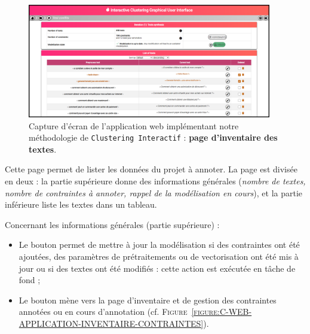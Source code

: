 		\begin{figure}[H]
			\centering
			\includegraphics[width=0.95\textwidth]{figures/interactive-clustering-application-textes}
			\caption{
				Capture d'écran de l'application web implémentant notre méthodologie de \texttt{Clustering Interactif} : \textbf{page d'inventaire des textes}.
			}
			\label{figure:C-WEB-APPLICATION-INVENTAIRE-TEXTES}
		\end{figure}
		
		Cette page permet de lister les données du projet à annoter.
		La page est divisée en deux : la partie supérieure donne des informations générales (\textit{nombre de textes, nombre de contraintes à annoter, rappel de la modélisation en cours}), et la partie inférieure liste les textes dans un tableau.
		
		Concernant les informations générales (partie supérieure) :
		\begin{itemize}
			\item Le bouton  permet de mettre à jour la modélisation si des contraintes ont été ajoutées, des paramètres de prétraitements ou de vectorisation ont été mis à jour ou si des textes ont été modifiés : cette action est exécutée en tâche de fond ;
			\item Le bouton  mène vers la page d'inventaire et de gestion des contraintes annotées ou en cours d'annotation (cf. \textsc{Figure~\ref{figure:C-WEB-APPLICATION-INVENTAIRE-CONTRAINTES}}).
		\end{itemize}
		
